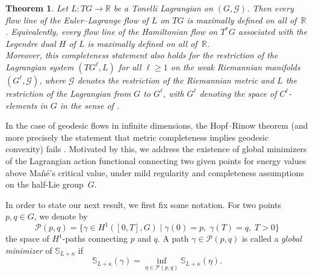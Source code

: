\documentclass[11pt,reqno]{amsart}
\theoremstyle{plain}
\newtheorem{thm}{Theorem}[section]
\theoremstyle{definition}
\theoremstyle{plain} %
\theoremstyle{definition} %
\numberwithin{equation}{section}
\begin{document}
\begin{thm}\label{prop: global existince of flow lines}
    Let $L \colon TG \to \mathbb{R}$ be a Tonelli Lagrangian on $(G, \mathcal{G})$. Then every flow line of the Euler–Lagrange flow of $L$ on $TG$ is maximally defined on all of~$\mathbb{R}$. Equivalently, every flow line of the Hamiltonian flow on $T^*G$ associated with the Legendre dual $H$ of $L$ is maximally defined on all of~$\mathbb{R}$. \\
    Moreover, this completeness statement also holds for the restriction of the Lagrangian system 
    \((TG^\ell, L)\) for all $\ell \geq 1$ on the weak Riemannian manifolds \((G^\ell, \mathcal{G})\), 
    where $\mathcal{G}$ denotes the restriction of the Riemannian metric and $L$ the restriction of the 
    Lagrangian from $G$ to $G^\ell$, with \( G^\ell \) denoting the space of \( C^\ell \)-elements in \( G \) in the sense of .
\end{thm}
In the case of geodesic flows in infinite dimensions, the Hopf--Rinow theorem (and more precisely the statement that metric completeness implies geodesic convexity) fails \cite{HopfrinowfalseAktkin}. 
Motivated by this, we address the existence of global minimizers of the Lagrangian action functional connecting two given points for energy values above Mañé’s critical value, under mild regularity and completeness assumptions on the half-Lie group~$G$.

In order to state our next result, we first fix some notation. 
For two points \( p, q \in G \), we denote by
\begin{equation*}
    \mathcal{P}(p, q) 
    = \{ \gamma \in H^1([0, T], G) \mid \gamma(0) = p, \; \gamma(T) = q, \; T > 0 \}
\end{equation*}
the space of \( H^1 \)-paths connecting \( p \) and \( q \). 
A path \( \gamma \in \mathcal{P}(p, q) \) is called a \textit{global minimizer} of \( \mathbb{S}_{L + \kappa} \) if 
\begin{equation*}
    \mathbb{S}_{L + \kappa}(\gamma) 
    = \inf_{\eta \in \mathcal{P}(p, q)} \mathbb{S}_{L + \kappa}(\eta).
\end{equation*}

\end{document}
